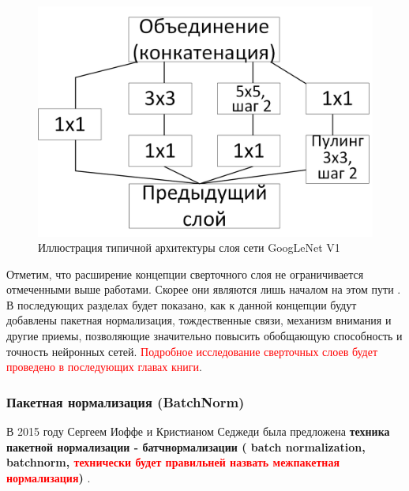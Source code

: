 \documentclass[12pt]{article}
\begin{document}
\begin{sloppypar}
\begin{figure}[!h]
	\begin{center}
		\includegraphics[width=0.5\linewidth]{./figuresch1/inception_layer.png}
		\caption{Иллюстрация типичной архитектуры слоя сети GoogLeNet V1}		
		\label{ch1:fig:inception_layer} 
	\end{center}
\end{figure}

Отметим, что расширение концепции сверточного слоя не ограничивается отмеченными выше работами. Скорее они являются лишь началом на этом пути \cite{khan2020survey}. В последующих разделах будет показано, как к данной концепции будут добавлены пакетная нормализация, тождественные связи, механизм внимания и другие приемы, позволяющие значительно повысить обобщающую способность и точность нейронных сетей. \textcolor{red}{Подробное исследование сверточных слоев будет проведено в последующих главах книги}.

\subsubsection{Пакетная нормализация (BatchNorm) }
В 2015 году Сергеем Иоффе и Кристианом Седжеди была предложена \textbf{техника пакетной нормализации - батчнормализации ( batch normalization, batchnorm, \textcolor{red}{технически будет правильней назвать межпакетная нормализация})} \cite{ioffe2015batch}. 


\end{sloppypar}
\end{document}
